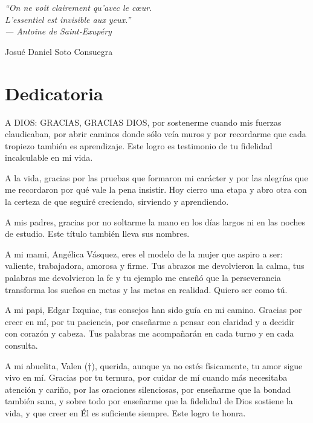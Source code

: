 \documentclass[11pt,letterpaper]{report}
\begin{document}
\vspace{1cm}

\begin{center}
\textit{``On ne voit clairement qu'avec le cœur. \\
L'essentiel est invisible aux yeux.''} \\
\textit{--- Antoine de Saint-Exupéry}
\end{center}

\vspace{1cm}

\begin{flushright}
Josué Daniel Soto Consuegra
\end{flushright}

\chapter*{Dedicatoria}
A DIOS: GRACIAS, GRACIAS DIOS, por sostenerme cuando mis fuerzas claudicaban, 
por abrir caminos donde sólo veía muros y por recordarme que cada tropiezo 
también es aprendizaje. Este logro es testimonio de tu fidelidad incalculable 
en mi vida.

A la vida, gracias por las pruebas que formaron mi carácter y por las alegrías 
que me recordaron por qué vale la pena insistir. Hoy cierro una etapa y abro 
otra con la certeza de que seguiré creciendo, sirviendo y aprendiendo.

A mis padres, gracias por no soltarme la mano en los días largos ni en las 
noches de estudio. Este título también lleva sus nombres.

A mi mami, Angélica Vásquez, eres el modelo de la mujer que aspiro a ser:
valiente, trabajadora, amorosa y firme. Tus abrazos me devolvieron la 
calma, tus palabras me devolvieron la fe y tu ejemplo me enseñó que la 
perseverancia transforma los sueños en metas y las metas en realidad. Quiero 
ser como tú.

A mi papi, Edgar Ixquiac, tus consejos han sido guía en mi camino. 
Gracias por creer en mí, por tu paciencia, por enseñarme a pensar con claridad 
y a decidir con corazón y cabeza. Tus palabras me acompañarán en cada turno y 
en cada consulta.

A mi abuelita, Valen ($\dagger$), querida, aunque ya no estés físicamente, tu
amor sigue vivo en mí. Gracias por tu ternura, por cuidar de mí cuando más
necesitaba atención y cariño, por las oraciones silenciosas, por enseñarme que
la bondad también sana, y sobre todo por enseñarme que la fidelidad de Dios
sostiene la vida, y que creer en Él es suficiente siempre. Este logro te honra.
\end{document}
